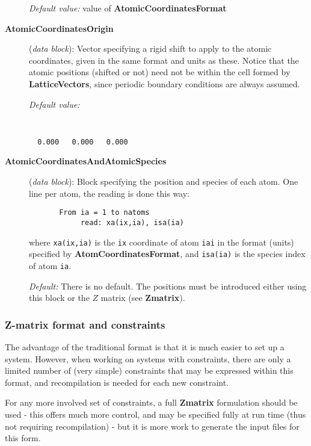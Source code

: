 \documentclass[11pt]{article}
\begin{document}
\begin{description}
{\it Default value:} value of {\bf AtomicCoordinatesFormat}


\item[{\bf AtomicCoordinatesOrigin}] ({\it data block}):
Vector specifying a rigid shift to apply to the atomic coordinates,
given in the same format and units as these. Notice that the atomic
positions (shifted or not) need not be within the cell formed by
{\bf LatticeVectors}, since periodic boundary conditions are always
assumed.

{\it Default value:}
{\tt
\begin{verbatim}
  0.000   0.000   0.000
\end{verbatim}
}

\item[{\bf AtomicCoordinatesAndAtomicSpecies}] ({\it data block}):
Block specifying the position and species of each atom.
One line per atom, the reading is done this way:
\begin{verbatim}
       From ia = 1 to natoms
            read: xa(ix,ia), isa(ia)
\end{verbatim}
where {\tt xa(ix,ia)} is the {\tt ix} coordinate of atom
{\tt iai} in the format (units) specified by
{\bf AtomCoordinatesFormat}, and {\tt isa(ia)} is the species
index of atom {\tt ia}.

{\it Default:} There is no default. The positions must be introduced
either using this block or the $Z$ matrix (see {\bf Zmatrix}).

\end{description}
\subsubsection{Z-matrix format and constraints}
\label{sec:Zmatrix}

The advantage of the traditional format is that it is
much easier to set up a system. However, when working
on systems with constraints, there are only a limited
number of (very simple) constraints that may be expressed
within this format, and recompilation is needed for each
new constraint.

For any more involved set of constraints, a
full \textbf{Zmatrix} formulation should be used - this
offers much more control, and may be specified fully at
run time (thus not requiring recompilation) - but
it is more work to generate the input files for this form.
\end{document}
